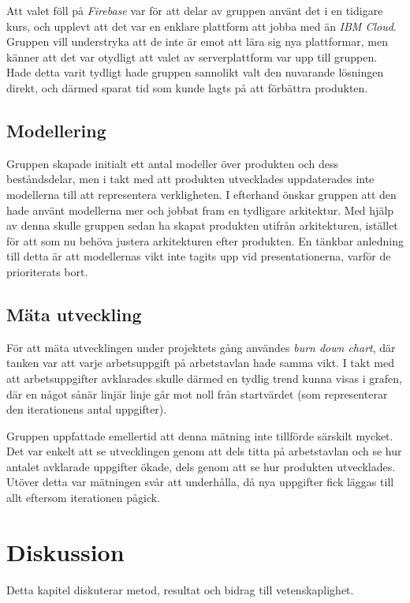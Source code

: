 \documentclass[conference]{IEEEtran}
\begin{document}
Att valet föll på \textit{Firebase} var för att delar av gruppen använt det i en tidigare kurs, och upplevt att det var en enklare plattform att jobba med än \textit{IBM Cloud}. Gruppen vill understryka att de inte är emot att lära sig nya plattformar, men känner att det var otydligt att valet av serverplattform var upp till gruppen. Hade detta varit tydligt hade gruppen sannolikt valt den nuvarande lösningen direkt, och därmed sparat tid som kunde lagts på att förbättra produkten.

\subsection{Modellering}\label{analys:modell}
Gruppen skapade initialt ett antal modeller över produkten och dess beståndsdelar, men i takt med att produkten utvecklades uppdaterades inte modellerna till att representera verkligheten. I efterhand önskar gruppen att den hade använt modellerna mer och jobbat fram en tydligare arkitektur. Med hjälp av denna skulle gruppen sedan ha skapat produkten utifrån arkitekturen, istället för att som nu behöva justera arkitekturen efter produkten. En tänkbar anledning till detta är att modellernas vikt inte tagits upp vid presentationerna, varför de prioriterats bort.

\subsection{Mäta utveckling}\label{analys:chart}
För att mäta utvecklingen under projektets gång användes \textit{burn down chart}, där tanken var att varje arbetsuppgift på arbetstavlan hade samma vikt. I takt med att arbetsuppgifter avklarades skulle därmed en tydlig trend kunna visas i grafen, där en något sånär linjär linje går mot noll från startvärdet (som representerar den iterationens antal uppgifter).

Gruppen uppfattade emellertid att denna mätning inte tillförde särskilt mycket. Det var enkelt att se utvecklingen genom att dels titta på arbetstavlan och se hur antalet avklarade uppgifter ökade, dels genom att se hur produkten utvecklades. Utöver detta var mätningen svår att underhålla, då nya uppgifter fick läggas till allt eftersom iterationen pågick.

\section{Diskussion}\label{diskussion}
Detta kapitel diskuterar metod, resultat och bidrag till vetenskaplighet.
\end{document}
